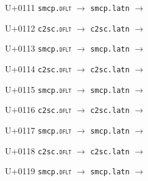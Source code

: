 \documentclass{article}
\begin{document}
\begin{substitutions}
\goodbreak

U+0111  \linebreak
    \texttt{smcp.\textsc{dflt}} $\to$  \linebreak
    \texttt{smcp.latn} $\to$  

\goodbreak

U+0112  \linebreak
    \texttt{c2sc.\textsc{dflt}} $\to$  \linebreak
    \texttt{c2sc.latn} $\to$  

\goodbreak

U+0113  \linebreak
    \texttt{smcp.\textsc{dflt}} $\to$  \linebreak
    \texttt{smcp.latn} $\to$  

\goodbreak

U+0114  \linebreak
    \texttt{c2sc.\textsc{dflt}} $\to$  \linebreak
    \texttt{c2sc.latn} $\to$  

\goodbreak

U+0115  \linebreak
    \texttt{smcp.\textsc{dflt}} $\to$  \linebreak
    \texttt{smcp.latn} $\to$  

\goodbreak

U+0116  \linebreak
    \texttt{c2sc.\textsc{dflt}} $\to$  \linebreak
    \texttt{c2sc.latn} $\to$  

\goodbreak

U+0117  \linebreak
    \texttt{smcp.\textsc{dflt}} $\to$  \linebreak
    \texttt{smcp.latn} $\to$  

\goodbreak

U+0118  \linebreak
    \texttt{c2sc.\textsc{dflt}} $\to$  \linebreak
    \texttt{c2sc.latn} $\to$  

\goodbreak

U+0119  \linebreak
    \texttt{smcp.\textsc{dflt}} $\to$  \linebreak
    \texttt{smcp.latn} $\to$  


\end{substitutions}
\end{document}
